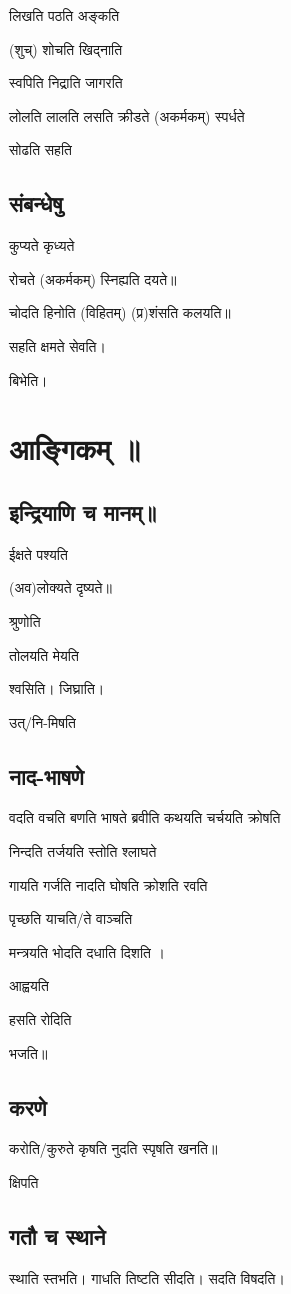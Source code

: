 \documentclass[oneside, article]{memoir}
\begin{document}
लिखति पठति अङ्कति

(शुच्) शोचति खिद्नाति

स्वपिति निद्राति जागरति

लोलति लालति लसति क्रीडते (अकर्मकम्) स्पर्धते

सोढति सहति

\subsection{संबन्धेषु}
कुप्यते कृध्यते

रोचते (अकर्मकम्) स्निह्यति दयते॥

चोदति हिनोति (विहितम्) (प्र)शंसति कलयति॥

सहति क्षमते सेवति।

बिभेति।

\section{आङ्गिकम् ॥}
\subsection{इन्द्रियाणि च मानम्॥}
ईक्षते पश्यति

(अव)लोक्यते दृष्यते॥

श्रुणोति 

तोलयति मेयति 

श्वसिति। जिघ्राति।

उत्/नि-मिषति

\subsection{नाद-भाषणे}
वदति वचति बणति भाषते ब्रवीति कथयति चर्चयति क्रोषति

निन्दति तर्जयति स्तोति श्लाघते

गायति गर्जति नादति घोषति क्रोशति रवति

पृच्छति याचति/ते वाञ्चति

मन्त्रयति भोदति दधाति दिशति ।

आह्वयति 

हसति रोदिति 

भजति॥

\subsection{करणे}
करोति/कुरुते कृषति नुदति स्पृषति खनति॥

क्षिपति

\subsection{गतौ च स्थाने}
स्थाति स्तभति। गाधति तिष्टति सीदति। सदति विषदति।
\end{document}
